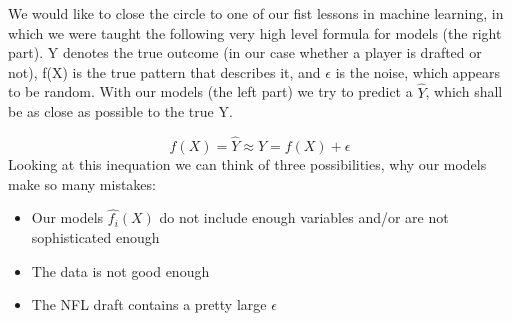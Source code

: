 \documentclass[]{article}
\providecommand{\tightlist}{%
  \setlength{\itemsep}{0pt}\setlength{\parskip}{0pt}}
\begin{document}
We would like to close the circle to one of our fist lessons in machine
learning, in which we were taught the following very high level formula
for models (the right part). Y denotes the true outcome (in our case
whether a player is drafted or not), f(X) is the true pattern that
describes it, and \(\epsilon\) is the noise, which appears to be random.
With our models (the left part) we try to predict a \(\hat{Y}\), which
shall be as close as possible to the true Y.

\[\hat{f}(X) = \hat{Y} \approx Y = f(X) + \epsilon\] Looking at this
inequation we can think of three possibilities, why our models make so
many mistakes:

\begin{itemize}
\tightlist
\item
  Our models \(\hat{f_i}(X)\) do not include enough variables and/or are
  not sophisticated enough
\item
  The data is not good enough
\item
  The NFL draft contains a pretty large \(\epsilon\)
\end{itemize}
\end{document}
